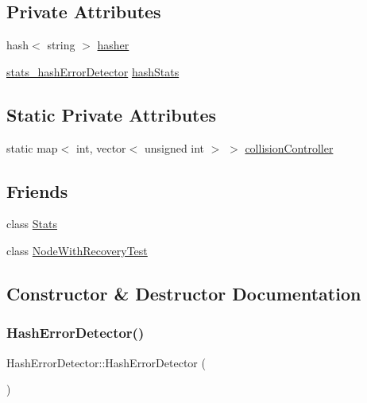\subsection*{Private Attributes}
\begin{DoxyCompactItemize}
\item 
hash$<$ string $>$ \hyperlink{class_hash_error_detector_a5193286d834f087e03b7299e81b60509}{hasher}
\item 
\hyperlink{_hash_error_detector_8h_afcf148bcfe372c25deda29220815b9e0}{stats\+\_\+hash\+Error\+Detector} \hyperlink{class_hash_error_detector_aec82c653679515b306b34eb075cf37fd}{hash\+Stats}
\end{DoxyCompactItemize}
\subsection*{Static Private Attributes}
\begin{DoxyCompactItemize}
\item 
static map$<$ int, vector$<$ unsigned int $>$ $>$ \hyperlink{class_hash_error_detector_a662a2baf62e11d8e2468aee44b9b168e}{collision\+Controller}
\end{DoxyCompactItemize}
\subsection*{Friends}
\begin{DoxyCompactItemize}
\item 
class \hyperlink{class_hash_error_detector_a129f65b6976377739eb6231b6962985e}{Stats}
\item 
class \hyperlink{class_hash_error_detector_a4a759c82473f06c7e89c3d75a509a390}{Node\+With\+Recovery\+Test}
\end{DoxyCompactItemize}


\subsection{Constructor \& Destructor Documentation}
\mbox{\label{class_hash_error_detector_a008bd7bd3f8d202334afd51a71cbbdae}} 
\subsubsection{\texorpdfstring{Hash\+Error\+Detector()}{HashErrorDetector()}}
{\footnotesize\ttfamily Hash\+Error\+Detector\+::\+Hash\+Error\+Detector (\begin{DoxyParamCaption}{ }\end{DoxyParamCaption})}

